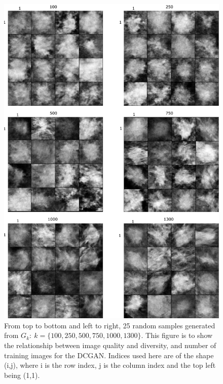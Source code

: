 \documentclass[final,3p,twocolumn,authoryear,sort&compress,times]{maia}
\begin{document}
\begin{figure}
    \centering
    \includegraphics{figures/5eachK.pdf}
    \caption{From top to bottom and left to right, 25 random samples generated from $G_k:\ k=\{100, 250, 500, 750, 1000, 1300\}$. This figure is to show the relationship between image quality and diversity, and number of training images for the DCGAN. Indices used here are of the shape (i,j), where i is the row index, j is the column index and the top left being (1,1).}
    \label{fig:5eachK}
\end{figure}
\end{document}
